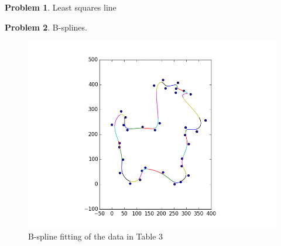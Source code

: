 \documentclass[10pt]{article}
\theoremstyle{plain}
\theoremstyle{definition}
\newtheorem{prob}{Problem}
\numberwithin{equation}{section}
\begin{document}
\begin{prob}
    Least squares line
\end{prob}
\begin{prob}
    B-splines.
    \begin{figure}[h]
        \centering
        \includegraphics[width=\textwidth]{doggy_splines}
        \caption{B-spline fitting of the data in Table 3}
    \end{figure}
\end{prob}
\end{document}

